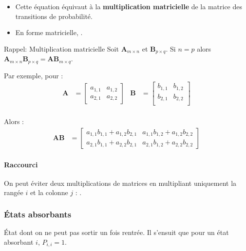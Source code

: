 \documentclass[french]{article}
\begin{document}
\begin{multicols*}{2}
\begin{definitionNOHFILLprop}
\bigskip

\begin{itemize}
	\item	Cette équation équivaut à la \textbf{multiplication matricielle} de la matrice des transitions de probabilité.
	\item	En forme matricielle, .
\end{itemize}
\end{definitionNOHFILLprop}

\begin{rappel}{Rappel: Multiplication matricielle}
Soit $\bm{A}_{m \times n}$ et $\bm{B}_{p \times q}$. Si $n = p$ alors $\bm{A}_{m \times n} \bm{B}_{p \times q} = \bm{AB}_{m \times q}$.

\bigskip

Par exemple, pour :
\begin{align*}
	\bm{A}
	&=	\begin{bmatrix}
		a_{1, 1}	&	a_{1, 2}	\\
		a_{2, 1}	&	a_{2, 2}	
		\end{bmatrix}	&
	\bm{B}
	&=	\begin{bmatrix}
		b_{1, 1}	&	b_{1, 2}	\\
		b_{2, 1}	&	b_{2, 2}	\\
		\end{bmatrix}	\\	
\end{align*}

Alors : 
\begin{align*}
	\bm{AB}
	&=	\begin{bmatrix}
		a_{1, 1}b_{1, 1} + a_{1, 2}b_{2, 1}	&	a_{1, 1}b_{1, 2} + a_{1, 2}b_{2, 2}	\\
		a_{2, 1}b_{1, 1} + a_{2, 2}b_{2, 1}	&	a_{2, 1}b_{1, 2} + a_{2, 2}b_{2, 2}	
		\end{bmatrix}	
\end{align*}
\end{rappel}


\paragraph{Raccourci}	On peut éviter deux multiplications de matrices en multipliant uniquement la rangée $i$ et la colonne $j$ : .


\subsubsection{États absorbants}
\begin{definitionNOHFILLsub}
État dont on ne peut pas sortir un fois rentrée. Il s'ensuit que pour un état absorbant $i$, $P_{i, i} = 1$.


\end{definitionNOHFILLsub}
\end{multicols*}
\end{document}
